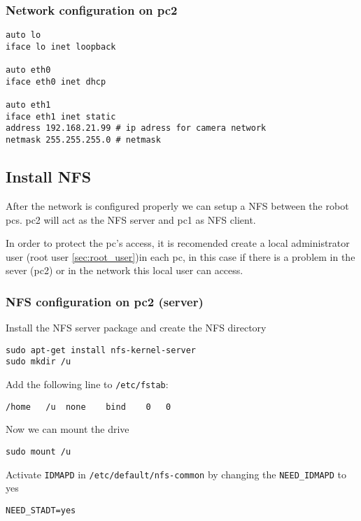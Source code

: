 \subsubsection{Network configuration on pc2}

\begin{lstlisting} 
auto lo
iface lo inet loopback

auto eth0
iface eth0 inet dhcp

auto eth1
iface eth1 inet static
address 192.168.21.99 # ip adress for camera network
netmask 255.255.255.0 # netmask
\end{lstlisting}

\subsection{Install NFS}
After the network is configured properly we can setup a NFS between the robot pcs. pc2 will act as the NFS server and pc1 as NFS client.

In order to protect the pc's access, it is recomended create a local administrator user (root user \ref{sec:root_user})in each pc, in this case if there is a problem in the sever (pc2) or in the network this local user can access.

\subsubsection{NFS configuration on pc2 (server)}
Install the NFS server package and create the NFS directory

\begin{lstlisting}
sudo apt-get install nfs-kernel-server
sudo mkdir /u 
\end{lstlisting}

Add the following line to \texttt{/etc/fstab}:

\begin{lstlisting}
/home	/u	none	bind	0	0
\end{lstlisting}

Now we can mount the drive

\begin{lstlisting}
sudo mount /u
\end{lstlisting}

Activate \texttt{IDMAPD} in \texttt{/etc/default/nfs-common} by changing the \texttt{NEED\_IDMAPD} to yes

\begin{lstlisting}
NEED_STADT=yes
\end{lstlisting}


